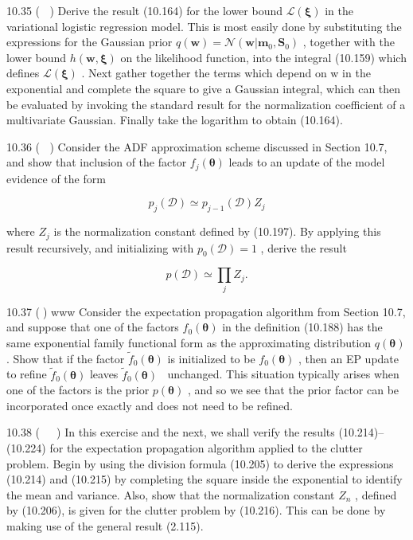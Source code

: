\documentclass[
  10
]{article}
\begin{document}
10.35 ( ) Derive the result (10.164) for the lower bound
\(\mathcal { L } ( \pmb { \xi } )\) in the variational logistic
regression model. This is most easily done by substituting the
expressions for the Gaussian prior
\(q ( \mathbf { w } ) = \mathcal { N } ( \mathbf { w } | \mathbf { m } _ { 0 } , \mathbf { S } _ { 0 } )\)
, together with the lower bound \(h ( \mathbf { w } , \pmb { \xi } )\)
on the likelihood function, into the integral (10.159) which defines
\(\mathcal { L } ( \pmb { \xi } )\) . Next gather together the terms
which depend on w in the exponential and complete the square to give a
Gaussian integral, which can then be evaluated by invoking the standard
result for the normalization coefficient of a multivariate Gaussian.
Finally take the logarithm to obtain (10.164).

10.36 ( ) Consider the ADF approximation scheme discussed in Section
10.7, and show that inclusion of the factor
\(f _ { j } ( \pmb \theta )\) leads to an update of the model evidence
of the form

\[
p _ {j} (\mathcal {D}) \simeq p _ {j - 1} (\mathcal {D}) Z _ {j}\tag{10.242}
\]

where \(Z _ { j }\) is the normalization constant defined by (10.197).
By applying this result recursively, and initializing with
\(p _ { 0 } ( \mathcal { D } ) = 1\) , derive the result

\[
p (\mathcal {D}) \simeq \prod_ {j} Z _ {j}.\tag{10.243}
\]

10.37 () www Consider the expectation propagation algorithm from Section
10.7, and suppose that one of the factors
\(f _ { 0 } ( \pmb { \theta } )\) in the definition (10.188) has the
same exponential family functional form as the approximating
distribution \(q ( \pmb \theta )\) . Show that if the factor
\(\widetilde { f } _ { 0 } ( \pmb { \theta } )\) is initialized to be
\(f _ { 0 } ( \pmb { \theta } )\) , then an EP update to refine
\(\widetilde { f } _ { 0 } ( \pmb { \theta } )\) leaves
\(\widetilde { f } _ { 0 } ( \pmb { \theta } )\)  unchanged. This
situation typically arises when one of the factors is the prior
\(p ( \pmb \theta )\) , and so we see that the prior factor can be
incorporated once exactly and does not need to be refined.

10.38 (  ) In this exercise and the next, we shall verify the results
(10.214)--(10.224) for the expectation propagation algorithm applied to
the clutter problem. Begin by using the division formula (10.205) to
derive the expressions (10.214) and (10.215) by completing the square
inside the exponential to identify the mean and variance. Also, show
that the normalization constant \(Z _ { n }\) , defined by (10.206), is
given for the clutter problem by (10.216). This can be done by making
use of the general result (2.115).
\end{document}
